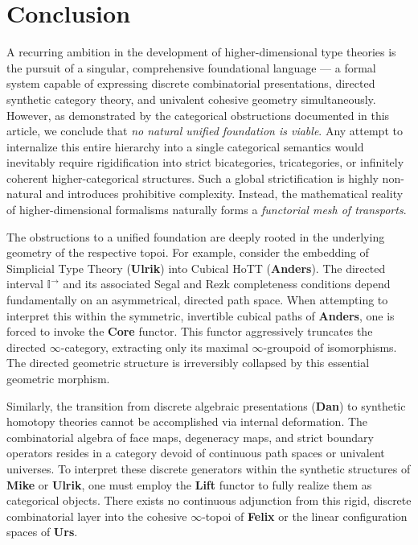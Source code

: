 \documentclass{article}
\theoremstyle{definition}
\theoremstyle{plain}
\begin{document}
\section{Conclusion}

A recurring ambition in the development of higher-dimensional type theories is the pursuit of a singular,
comprehensive foundational language --- a formal system capable of expressing discrete combinatorial presentations,
directed synthetic category theory, and univalent cohesive geometry simultaneously.
However, as demonstrated by the categorical obstructions documented in this article,
we conclude that \emph{no natural unified foundation is viable}. Any attempt to internalize this entire
hierarchy into a single categorical semantics would inevitably require rigidification into strict bicategories,
tricategories, or infinitely coherent higher-categorical structures. Such a global strictification is highly
non-natural and introduces prohibitive complexity. Instead, the mathematical reality of higher-dimensional
formalisms naturally forms a \emph{functorial mesh of transports}.

The obstructions to a unified foundation are deeply rooted in the underlying geometry of the respective topoi.
For example, consider the embedding of Simplicial Type Theory (\textbf{Ulrik}) into Cubical HoTT (\textbf{Anders}).
The directed interval $\mathbb{I}^{\to}$ and its associated Segal and Rezk completeness conditions depend
fundamentally on an asymmetrical, directed path space. When attempting to interpret this within the symmetric,
invertible cubical paths of \textbf{Anders}, one is forced to invoke the \textbf{Core} functor. This functor
aggressively truncates the directed $\infty$-category, extracting only its maximal $\infty$-groupoid of isomorphisms.
The directed geometric structure is irreversibly collapsed by this essential geometric morphism.

Similarly, the transition from discrete algebraic presentations (\textbf{Dan}) to synthetic homotopy
theories cannot be accomplished via internal deformation. The combinatorial algebra of face maps,
degeneracy maps, and strict boundary operators resides in a category devoid of continuous path spaces
or univalent universes. To interpret these discrete generators within the synthetic structures of \textbf{Mike}
or \textbf{Ulrik}, one must employ the \textbf{Lift} functor to fully realize them as categorical objects.
There exists no continuous adjunction from this rigid, discrete combinatorial layer into the cohesive
$\infty$-topoi of \textbf{Felix} or the linear configuration spaces of \textbf{Urs}.
\end{document}
